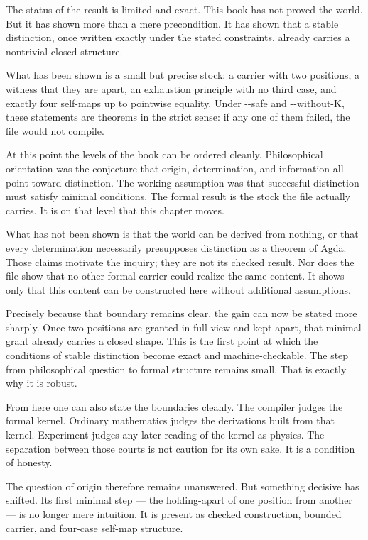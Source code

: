 \documentclass[11pt,a4paper]{book}
\newcommand{\AgdaFlag}[1]{\texttt{-{}-#1}}
\def\texttt#1{#1}%
\begin{document}
The status of the result is limited and exact. This book has not proved the
world. But it has shown more than a mere precondition. It has shown that a
stable distinction, once written exactly under the stated constraints,
already carries a nontrivial closed structure.

What has been shown is a small but precise stock: a carrier with two
positions, a witness that they are apart, an exhaustion principle with no
third case, and exactly four self-maps up to pointwise equality. Under
\AgdaFlag{safe} and \AgdaFlag{without-K}, these statements are theorems in
the strict sense: if any one of them failed, the file would not compile.

At this point the levels of the book can be ordered cleanly. Philosophical
orientation was the conjecture that origin, determination, and information
all point toward distinction. The working assumption was that successful
distinction must satisfy minimal conditions. The formal result is the stock
the file actually carries. It is on that level that this chapter moves.

What has not been shown is that the world can be derived from nothing, or
that every determination necessarily presupposes distinction as a theorem
of Agda. Those claims motivate the inquiry; they are not its checked
result. Nor does the file show that no other formal carrier could realize
the same content. It shows only that this content can be constructed here
without additional assumptions.

Precisely because that boundary remains clear, the gain can now be stated
more sharply. Once two positions are granted in full view and kept apart,
that minimal grant already carries a closed shape. This is the first point
at which the conditions of stable distinction become exact and
machine-checkable. The step from philosophical question to formal structure
remains small. That is exactly why it is robust.

From here one can also state the boundaries cleanly. The compiler judges
the formal kernel. Ordinary mathematics judges the derivations built from
that kernel. Experiment judges any later reading of the kernel as physics.
The separation between those courts is not caution for its own sake. It is
a condition of honesty.

The question of origin therefore remains unanswered. But something decisive
has shifted. Its first minimal step --- the holding-apart of one position
from another --- is no longer mere intuition. It is present as checked
construction, bounded carrier, and four-case self-map structure.
\end{document}
